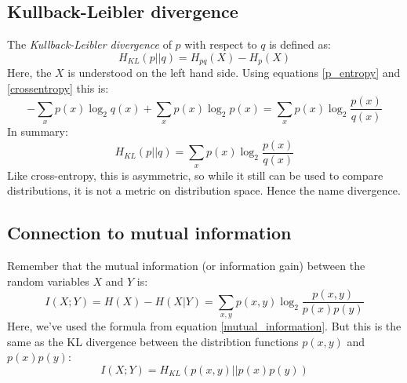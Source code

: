 \documentclass[12pt, a4paper]{article}
\numberwithin{equation}{section}
\begin{document}
\subsection{Kullback-Leibler divergence}
The \textit{Kullback-Leibler divergence} of $p$ with respect to $q$ is defined as:
\begin{equation}
H_{KL}(p||q)=H_{pq}(X)-H_p(X)
\end{equation} 
Here, the $X$ is understood on the left hand side. Using equations \ref{p_entropy} and \ref{crossentropy} this is:
\begin{equation}
-\sum_x p(x)\log_2 q(x)+\sum_x p(x)\log_2 p(x)=\sum_x p(x)\log_2\frac{p(x)}{q(x)}
\end{equation}
In summary:
\begin{equation}
\label{kl_divergence}
H_{KL}(p||q)=\sum_x p(x)\log_2\frac{p(x)}{q(x)}
\end{equation}
Like cross-entropy, this is asymmetric, so while it still can be used to compare distributions, it is not a metric on distribution space. Hence the name divergence.

\subsection{Connection to mutual information}
Remember that the mutual information (or information gain) between the random variables $X$ and $Y$ is:
\begin{equation}
I(X;Y)=H(X)-H(X|Y)=\sum_{x,y}p(x,y)\log_2\frac{p(x,y)}{p(x)p(y)}
\end{equation}
Here, we've used the formula from equation \ref{mutual_information}. But this is the same as the KL divergence between the distribtion functions $p(x,y)$ and $p(x)p(y)$:
\begin{equation}
I(X;Y)=H_{KL}(p(x,y)||p(x)p(y))
\end{equation}
\end{document}
